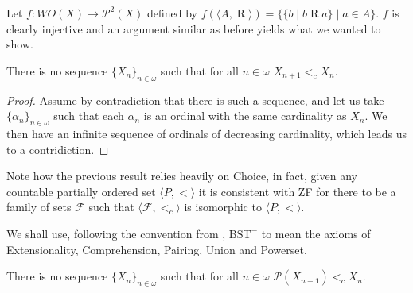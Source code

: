 \documentclass{article}
\begin{document}
Let $f:WO(X)\rightarrow \mathcal{P}^2(X)$ defined by $f(\langle A,\mathrel{R}\rangle) = \{\{b\mid b \mathrel{R} a\} \mid a\in A\}$. $f$ is clearly injective and an argument similar as before yields what we wanted to show.


\begin{theorem}[ZFC]
	There is no sequence $\{X_n\}_{n\in\omega}$ such that for all $n\in\omega$ $X_{n+1} <_c X_n$.
\end{theorem}
\begin{proof}
	Assume by contradiction that there is such a sequence, and let us take $\{\alpha_n\}_{n\in\omega}$ such that each $\alpha_n$ is an ordinal with the same cardinality as $X_n$. We then have an infinite sequence of ordinals of decreasing cardinality, which leads us to a contridiction.
\end{proof}

Note how the previous result relies heavily on Choice, in fact, given any countable partially ordered set $\langle P,< \rangle$ it is consistent with ZF for there to be a family of sets $\mathcal{F}$ such that $\langle \mathcal{F},<_c\rangle$ is isomorphic to $\langle P,< \rangle$.

We shall use, following the convention from \cite[Def. I.3.1]{Kunen}, $\text{BST}^{-}$ to mean the axioms of Extensionality, Comprehension, Pairing, Union and Powerset.

\begin{theorem}
	There is no sequence $\{X_n\}_{n\in\omega}$ such that for all $n\in\omega$ $\mathcal{P}(X_{n+1}) <_c X_n$.
\end{theorem}
\end{document}
